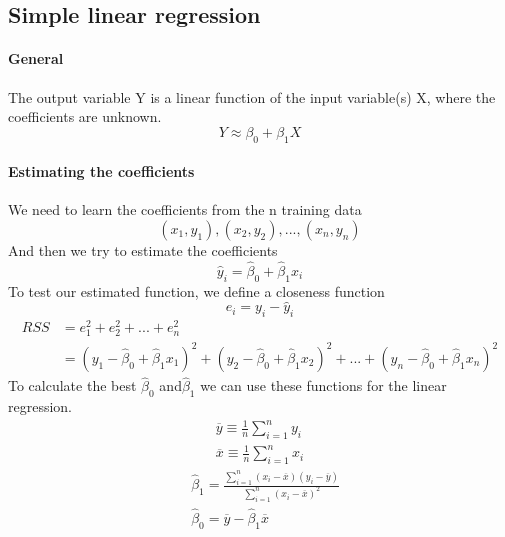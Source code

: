 \documentclass[../document.tex]{subfiles}
\begin{document}
	\subsection{Simple linear regression}

	\paragraph{General}
	The output variable Y is a linear function of the input variable(s) X, where the coefficients are unknown.
	\begin{equation}
		Y \approx \beta_{0} + \beta_{1}X
	\end{equation}

	\paragraph{Estimating the coefficients}
	We need to learn the coefficients from the n training data
	\begin{equation}
	(x_{1},y_{1}),(x_{2},y_{2}),...,(x_{n},y_{n})
	\end{equation}
	And then we try to estimate the coefficients
	\begin{equation}
	\hat{y}_{i} = \hat{\beta}_{0} + \hat{\beta}_{1}x_{i}
	\end{equation}
	To test our estimated function, we define a closeness function
	\begin{equation}
		e_{i}=y_{i}-\hat{y}_{i}
	\end{equation}
	\begin{equation}
	\begin{split}
		RSS &= e^2_{1}+e^2_{2}+...+e^2_{n}\\
			&= (y_{1}-\hat{\beta}_{0} + \hat{\beta}_{1}x_{1})^2+
			(y_{2}-\hat{\beta}_{0} + \hat{\beta}_{1}x_{2})^2+...+
			(y_{n}-\hat{\beta}_{0} + \hat{\beta}_{1}x_{n})^2
	\end{split}
	\end{equation}
	To calculate the best \(\hat{\beta}_{0}\) and\(\hat{\beta}_{1}\) we can use these functions for the linear regression.
	\begin{equation}
	\begin{split}
		\overline{y}\equiv\frac{1}{n}\sum_{i=1}^{n}y_{i}\\
		\overline{x}\equiv\frac{1}{n}\sum_{i=1}^{n}x_{i}
	\end{split}
	\end{equation}
	\begin{equation}
	\begin{split}
		&\hat{\beta}_{1}=\frac{\sum_{i=1}^{n}(x_{i}-\overline{x})(y_{i}-\overline{y})}{\sum_{i=1}^{n}(x_{i}-\overline{x})^2}\\
		&\hat{\beta}_{0}=\overline{y}-\hat{\beta}_{1}\overline{x}
	\end{split}
	\end{equation}
\end{document}
